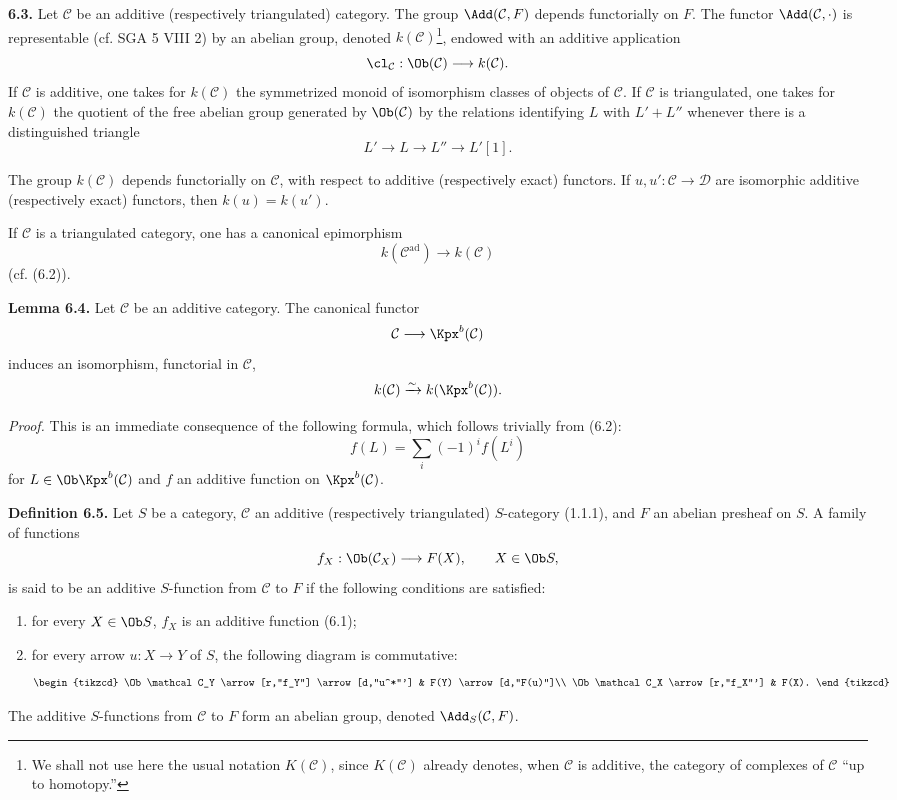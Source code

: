 \textbf{6.3.} Let \(\mathcal C\) be an additive (respectively triangulated) category. The group \(\Add(\mathcal C,F)\) depends functorially on \(F\). The functor \(\Add(\mathcal C,\cdot)\) is representable (cf. SGA 5 VIII 2) by an abelian group, denoted \(k(\mathcal C)\)\footnote{We shall not use here the usual notation \(K(\mathcal C)\), since \(K(\mathcal C)\) already denotes, when \(\mathcal C\) is additive, the category of complexes of \(\mathcal C\) ``up to homotopy.''}, endowed with an additive application
\[
  \cl_{\mathcal C}:\Ob(\mathcal C)\longrightarrow k(\mathcal C).
\]
If \(\mathcal C\) is additive, one takes for \(k(\mathcal C)\) the symmetrized monoid of isomorphism classes of objects of \(\mathcal C\). If \(\mathcal C\) is triangulated, one takes for \(k(\mathcal C)\) the quotient of the free abelian group generated by \(\Ob(\mathcal C)\) by the relations identifying \(L\) with \(L'+L''\) whenever there is a distinguished triangle
\[
  L'\longrightarrow L\longrightarrow L''\longrightarrow L'[1].
\]

The group \(k(\mathcal C)\) depends functorially on \(\mathcal C\), with respect to additive (respectively exact) functors. If \(u,u':\mathcal C\to\mathcal D\) are isomorphic additive (respectively exact) functors, then \(k(u)=k(u')\).

If \(\mathcal C\) is a triangulated category, one has a canonical epimorphism
\[
  k(\mathcal C^{\mathrm{ad}})\longrightarrow k(\mathcal C)
\]
(cf. (6.2)).

\textbf{Lemma 6.4.} Let \(\mathcal C\) be an additive category. The canonical functor
\[
  \mathcal C\longrightarrow \Kpx^b(\mathcal C)
\]
induces an isomorphism, functorial in \(\mathcal C\),
\[
  k(\mathcal C)\xrightarrow{\sim} k(\Kpx^b(\mathcal C)).
\]

\emph{Proof.} This is an immediate consequence of the following formula, which follows trivially from (6.2):
\begin{equation}\tag{6.4.1}
  f(L)=\sum_i (-1)^i f(L^i)
\end{equation}
for \(L\in\Ob\Kpx^b(\mathcal C)\) and \(f\) an additive function on \(\Kpx^b(\mathcal C)\).

\textbf{Definition 6.5.} Let \(S\) be a category, \(\mathcal C\) an additive (respectively triangulated) \(S\)-category (1.1.1), and \(F\) an abelian presheaf on \(S\). A family of functions
\[
  f_X:\Ob(\mathcal C_X)\longrightarrow F(X),
  \qquad X\in\Ob S,
\]
is said to be an additive \(S\)-function from \(\mathcal C\) to \(F\) if the following conditions are satisfied:
\begin{enumerate}[label=(\roman*)]
\item for every \(X\in\Ob S\), \(f_X\) is an additive function (6.1);
\item for every arrow \(u:X\to Y\) of \(S\), the following diagram is commutative:
\[
\begin{tikzcd}
\Ob\mathcal C_Y \arrow[r,"f_Y"] \arrow[d,"u^*"'] & F(Y) \arrow[d,"F(u)"]\\
\Ob\mathcal C_X \arrow[r,"f_X"'] & F(X).
\end{tikzcd}
\]
\end{enumerate}
The additive \(S\)-functions from \(\mathcal C\) to \(F\) form an abelian group, denoted \(\Add_S(\mathcal C,F)\).

